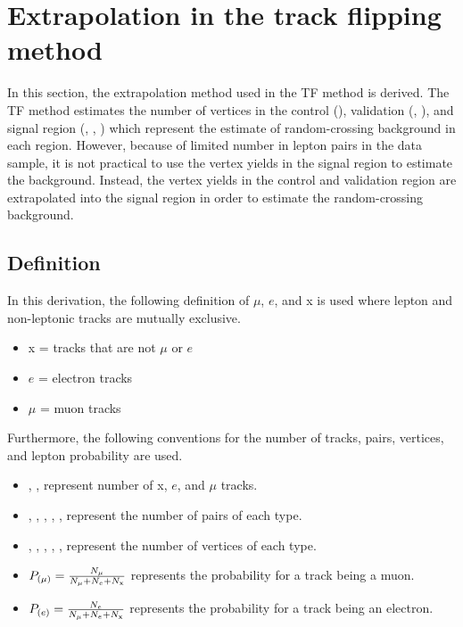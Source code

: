 \section{Extrapolation in the track flipping method}
In this section, the extrapolation method used in the TF method is derived. The TF method estimates the number of vertices in the control (\xx), validation (\mux, \ex), and signal region (\mumu, \ee, \emu) which represent the estimate of random-crossing background in each region. However, because of limited number in lepton pairs in the data sample, it is not practical to use the vertex yields in the signal region to estimate the background. Instead, the vertex yields in the control and validation region are extrapolated into the signal region in order to estimate the random-crossing background.



\subsection{Definition}
In this derivation, the following definition of $\mu$, $e$, and x is used where lepton and non-leptonic tracks are mutually exclusive.
\begin{itemize}
\item x = tracks that are not $\mu$ or $e$
\item $e$ = electron tracks
\item $\mu$ = muon tracks 
\end{itemize}

Furthermore, the following conventions for the number of tracks, pairs, vertices, and lepton probability are used.
\begin{itemize}
\item \Nx, \Ne, \Nm represent number of x, $e$, and $\mu$ tracks.
\item \Nxx, \Nmx, \Nex, \Nmm, \Nee, \Nem represent the number of pairs of each type.
\item \NVxx{}, \NVmx{}, \NVex{}, \NVmm{}, \NVee{}, \NVem{} represent the number of vertices of each type.
\item $P_{(\mu)}  = \frac{N_{\mu}}{N_{\mu} + N_{e} + N_{\mathrm{x}}}$ represents the probability for a track being a muon.
\item $P_{(e)}  = \frac{N_{e}}{N_{\mu} + N_{e} + N_{\mathrm{x}}}$ represents the probability for a track being an electron.
\end{itemize}



